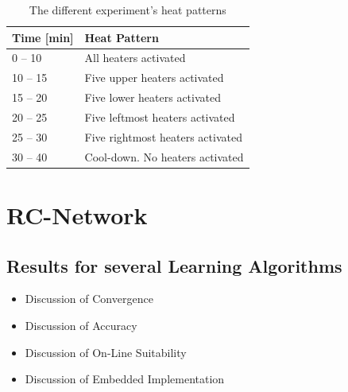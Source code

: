 \begin{center}
	\begin{table}
		
		\begin{center}
			\begin{tabular}{|p{3.00cm}|p{6.48cm}|}
				
				\hline  \textbf{Time [min]} & \textbf{Heat Pattern}\\ 
				\hline \hline 0 -- 10 & All heaters activated\\ 
				\hline  10 -- 15 & Five upper heaters activated\\ 
				\hline  15 -- 20 & Five lower heaters activated\\ 
				\hline  20 -- 25 & Five leftmost heaters activated\\ 
				\hline  25 -- 30 & Five rightmost heaters activated\\ 
				\hline  30 -- 40 & Cool-down. No heaters activated\\ 
				\hline
			\end{tabular} 
			\caption{The different experiment's heat patterns}
			 \label{tab:heat_pattern}
		\end{center}
	\end{table}
	
\end{center}

\section{RC-Network}
\subsection{Results for several Learning Algorithms}
\begin{itemize}
\item{Discussion of Convergence}
\item{Discussion of Accuracy}
\item{Discussion of On-Line Suitability}
\item{Discussion of Embedded Implementation}
\end{itemize}
